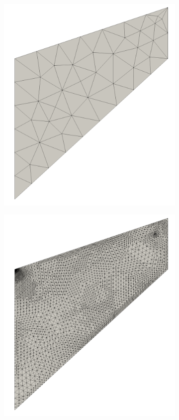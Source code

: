 \begin{figure}[ht!]
\centering
\begin{subfigure}{.5\textwidth}
\centering
\includegraphics[width=.99\linewidth]{img/mech_cooks_pw_initial_mesh.png}
\end{subfigure}%
\begin{subfigure}{.5\textwidth}
\centering
\includegraphics[width=.99\linewidth]{img/mech_cooks_pw_final_mesh.png}

\end{subfigure}
\end{figure}
